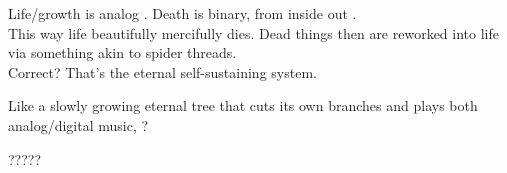 Life/growth is analog . Death is binary, from inside out . \\
This way life beautifully mercifully dies. Dead things then are reworked into life via something akin to spider threads. \\
Correct? That's the eternal self-sustaining  system.

Like a slowly growing eternal tree that cuts its own branches and plays both analog/digital music,  ?

?????
